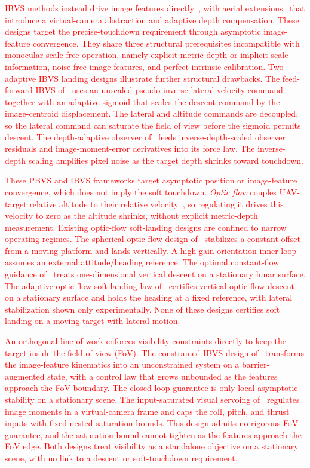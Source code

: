 \documentclass{IEEEtaes}
\newcommand{\new}[1]{\textcolor{red}{#1}}
\begin{document}
\new{IBVS methods instead drive image features directly~\cite{chaumette2006}, with aerial extensions~\cite{jabbari2014, lee2012, fink2017, xie2016_2, xie2020} that introduce a virtual-camera abstraction and adaptive depth compensation. These designs target the precise-touchdown requirement through asymptotic image-feature convergence. They share three structural prerequisites incompatible with monocular scale-free operation, namely explicit metric depth or implicit scale information, noise-free image features, and perfect intrinsic calibration. Two adaptive IBVS landing designs illustrate further structural drawbacks. The feed-forward IBVS of~\cite{cho2022} uses an unscaled pseudo-inverse lateral velocity command together with an adaptive sigmoid that scales the descent command by the image-centroid displacement. The lateral and altitude commands are decoupled, so the lateral command can saturate the field of view before the sigmoid permits descent. The depth-adaptive observer of~\cite{chen2025} feeds inverse-depth-scaled observer residuals and image-moment-error derivatives into its force law. The inverse-depth scaling amplifies pixel noise as the target depth shrinks toward touchdown.}

\new{These PBVS and IBVS frameworks target asymptotic position or image-feature convergence, which does not imply the soft touchdown. \emph{Optic flow} couples UAV-target relative altitude to their relative velocity~\cite{herisse2012, izzo2011, singhal2025}, so regulating it drives this velocity to zero as the altitude shrinks, without explicit metric-depth measurement. Existing optic-flow soft-landing designs are confined to narrow operating regimes. The spherical-optic-flow design of~\cite{herisse2012} stabilizes a constant offset from a moving platform and lands vertically. A high-gain orientation inner loop assumes an external attitude/heading reference. The optimal constant-flow guidance of~\cite{izzo2011} treats one-dimensional vertical descent on a stationary lunar surface. The adaptive optic-flow soft-landing law of~\cite{singhal2025} certifies vertical optic-flow descent on a stationary surface and holds the heading at a fixed reference, with lateral stabilization shown only experimentally. None of these designs certifies soft landing on a moving target with lateral motion.}

\new{An orthogonal line of work enforces visibility constraints directly to keep the target inside the field of view (FoV). The constrained-IBVS design of~\cite{salehi2021} transforms the image-feature kinematics into an unconstrained system on a barrier-augmented state, with a control law that grows unbounded as the features approach the FoV boundary. The closed-loop guarantee is only local asymptotic stability on a stationary scene. The input-saturated visual servoing of~\cite{xie2016} regulates image moments in a virtual-camera frame and caps the roll, pitch, and thrust inputs with fixed nested saturation bounds. This design admits no rigorous FoV guarantee, and the saturation bound cannot tighten as the features approach the FoV edge. Both designs treat visibility as a standalone objective on a stationary scene, with no link to a descent or soft-touchdown requirement.}
\end{document}
